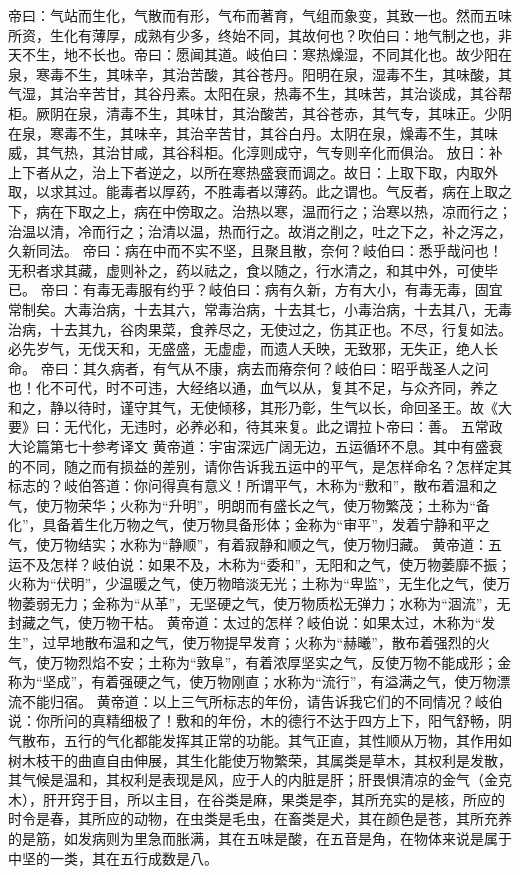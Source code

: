 \documentclass[a4paper,12pt,UTF8,twoside]{ctexbook}
\begin{document}
帝曰：气站而生化，气散而有形，气布而著育，气组而象变，其致一也。然而五味所资，生化有薄厚，成熟有少多，终始不同，其故何也？吹伯曰：地气制之也，非天不生，地不长也。帝曰：愿闻其道。岐伯曰：寒热燥湿，不同其化也。故少阳在泉，寒毒不生，其味辛，其治苦酸，其谷苍丹。阳明在泉，湿毒不生，其味酸，其气湿，其治辛苦甘，其谷丹素。太阳在泉，热毒不生，其味苦，其治谈成，其谷帮柜。厥阴在泉，清毒不生，其味甘，其治酸苦，其谷苍赤，其气专，其味正。少阴在泉，寒毒不生，其味辛，其治辛苦甘，其谷白丹。太阴在泉，燥毒不生，其味威，其气热，其治甘咸，其谷科柜。化淳则成守，气专则辛化而俱治。
放日：补上下者从之，治上下者逆之，以所在寒热盛衰而调之。故日：上取下取，内取外取，以求其过。能毒者以厚药，不胜毒者以薄药。此之谓也。气反者，病在上取之下，病在下取之上，病在中傍取之。治热以寒，温而行之；治寒以热，凉而行之；治温以清，冷而行之；治清以温，热而行之。故消之削之，吐之下之，补之泻之，久新同法。
帝曰：病在中而不实不坚，且聚且散，奈何？岐伯曰：悉乎哉问也！无积者求其藏，虚则补之，药以祛之，食以随之，行水清之，和其中外，可使毕已。
帝曰：有毒无毒服有约乎？岐伯曰：病有久新，方有大小，有毒无毒，固宜常制矣。大毒治病，十去其六，常毒治病，十去其七，小毒治病，十去其八，无毒治病，十去其九，谷肉果菜，食养尽之，无使过之，伤其正也。不尽，行复如法。必先岁气，无伐天和，无盛盛，无虚虚，而遗人夭映，无致邪，无失正，绝人长命。
帝曰：其久病者，有气从不康，病去而瘠奈何？岐伯曰：昭乎哉圣人之问也！化不可代，时不可违，大经络以通，血气以从，复其不足，与众齐同，养之
和之，静以待时，谨守其气，无使倾移，其形乃彰，生气以长，命回圣王。故《大要》曰：无代化，无违时，必养必和，待其来复。此之谓拉卜帝曰：善。
五常政大论篇第七十参考译文
黄帝道：宇宙深远广阔无边，五运循环不息。其中有盛衰的不同，随之而有损益的差别，请你告诉我五运中的平气，是怎样命名？怎样定其标志的？岐伯答道：你问得真有意义！所谓平气，木称为“敷和”，散布着温和之气，使万物荣华；火称为“升明”，明朗而有盛长之气，使万物繁茂；土称为“备化”，具备着生化万物之气，使万物具备形体；金称为“审平”，发着宁静和平之气，使万物结实；水称为“静顺”，有着寂静和顺之气，使万物归藏。
黄帝道：五运不及怎样？岐伯说：如果不及，木称为“委和”，无阳和之气，使万物萎靡不振；火称为“伏明”，少温暖之气，使万物暗淡无光；土称为“卑监”，无生化之气，使万物萎弱无力；金称为“从革”，无坚硬之气，使万物质松无弹力；水称为“涸流”，无封藏之气，使万物干枯。
黄帝道：太过的怎样？岐伯说：如果太过，木称为“发生”，过早地散布温和之气，使万物提早发育；火称为“赫曦”，散布着强烈的火气，使万物烈焰不安；土称为“敦阜”，有着浓厚坚实之气，反使万物不能成形；金称为“坚成”，有着强硬之气，使万物刚直；水称为“流行”，有溢满之气，使万物漂流不能归宿。
黄帝道：以上三气所标志的年份，请告诉我它们的不同情况？岐伯说：你所问的真精细极了！敷和的年份，木的德行不达于四方上下，阳气舒畅，阴气散布，五行的气化都能发挥其正常的功能。其气正直，其性顺从万物，其作用如树木枝干的曲直自由伸展，其生化能使万物繁荣，其属类是草木，其权利是发散，其气候是温和，其权利是表现是风，应于人的内脏是肝；肝畏惧清凉的金气（金克木），肝开窍于目，所以主目，在谷类是麻，果类是李，其所充实的是核，所应的时令是春，其所应的动物，在虫类是毛虫，在畜类是犬，其在颜色是苍，其所充养的是筋，如发病则为里急而胀满，其在五味是酸，在五音是角，在物体来说是属于中坚的一类，其在五行成数是八。
\end{document}
